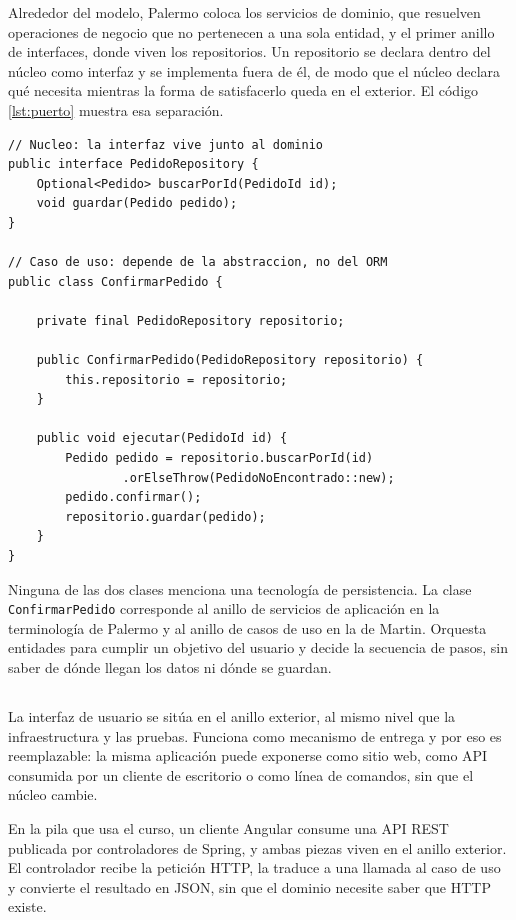 \documentclass[10pt,a4paper]{article}
\begin{document}
Alrededor del modelo, Palermo coloca los servicios de dominio, que resuelven operaciones de negocio que no pertenecen a una sola entidad, y el primer anillo de interfaces, donde viven los repositorios. Un repositorio se declara dentro del núcleo como interfaz y se implementa fuera de él, de modo que el núcleo declara qué necesita mientras la forma de satisfacerlo queda en el exterior. El código \ref{lst:puerto} muestra esa separación.

\begin{lstlisting}[caption={Interfaz declarada en el núcleo y caso de uso que la consume},label={lst:puerto}]
// Nucleo: la interfaz vive junto al dominio
public interface PedidoRepository {
	Optional<Pedido> buscarPorId(PedidoId id);
	void guardar(Pedido pedido);
}

// Caso de uso: depende de la abstraccion, no del ORM
public class ConfirmarPedido {

	private final PedidoRepository repositorio;

	public ConfirmarPedido(PedidoRepository repositorio) {
		this.repositorio = repositorio;
	}

	public void ejecutar(PedidoId id) {
		Pedido pedido = repositorio.buscarPorId(id)
				.orElseThrow(PedidoNoEncontrado::new);
		pedido.confirmar();
		repositorio.guardar(pedido);
	}
}
\end{lstlisting}

Ninguna de las dos clases menciona una tecnología de persistencia. La clase \texttt{ConfirmarPedido} corresponde al anillo de servicios de aplicación en la terminología de Palermo y al anillo de casos de uso en la de Martin. Orquesta entidades para cumplir un objetivo del usuario y decide la secuencia de pasos, sin saber de dónde llegan los datos ni dónde se guardan.

\subsection{ \color{colorESCOM}{Interfaz de usuario}}

La interfaz de usuario se sitúa en el anillo exterior, al mismo nivel que la infraestructura y las pruebas. Funciona como mecanismo de entrega y por eso es reemplazable: la misma aplicación puede exponerse como sitio web, como API consumida por un cliente de escritorio o como línea de comandos, sin que el núcleo cambie.

En la pila que usa el curso, un cliente Angular consume una API REST publicada por controladores de Spring, y ambas piezas viven en el anillo exterior. El controlador recibe la petición HTTP, la traduce a una llamada al caso de uso y convierte el resultado en JSON, sin que el dominio necesite saber que HTTP existe.
\end{document}
